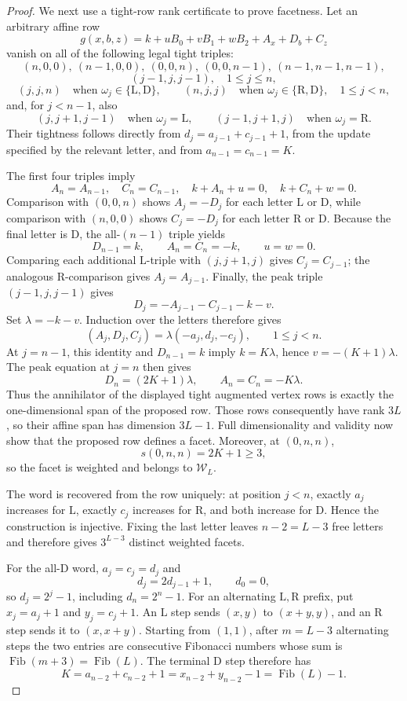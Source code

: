 \documentclass{article}
\begin{document}
\begin{proof}
We next use a tight-row rank certificate to prove facetness.  Let an arbitrary affine row
\[
 g(x,b,z)=k+uB_0+vB_1+wB_2+A_x+D_b+C_z
\]
vanish on all of the following legal tight triples:
\[
 (n,0,0),\ (n-1,0,0),\ (0,0,n),\ (0,0,n-1),\ (n-1,n-1,n-1),
\]
\[
 (j-1,j,j-1),\quad 1\le j\le n,
\]
\[
 (j,j,n)\quad\text{when }\omega_j\in\{\mathrm L,\mathrm D\},
 \qquad
 (n,j,j)\quad\text{when }\omega_j\in\{\mathrm R,\mathrm D\},
 \quad 1\le j<n,
\]
and, for \(j<n-1\), also
\[
 (j,j+1,j-1)\quad\text{when }\omega_j=\mathrm L,
 \qquad
 (j-1,j+1,j)\quad\text{when }\omega_j=\mathrm R.
\]
Their tightness follows directly from \(d_j=a_{j-1}+c_{j-1}+1\), from the update specified by the relevant letter, and from \(a_{n-1}=c_{n-1}=K\).

The first four triples imply
\[
 A_n=A_{n-1},\quad C_n=C_{n-1},\quad
 k+A_n+u=0,\quad k+C_n+w=0.
\]
Comparison with \((0,0,n)\) shows \(A_j=-D_j\) for each letter \(\mathrm L\) or \(\mathrm D\), while comparison with \((n,0,0)\) shows \(C_j=-D_j\) for each letter \(\mathrm R\) or \(\mathrm D\).  Because the final letter is \(\mathrm D\), the all-\((n-1)\) triple yields
\[
 D_{n-1}=k,\qquad A_n=C_n=-k,\qquad u=w=0.
\]
Comparing each additional \(\mathrm L\)-triple with \((j,j+1,j)\) gives \(C_j=C_{j-1}\); the analogous \(\mathrm R\)-comparison gives \(A_j=A_{j-1}\).  Finally, the peak triple \((j-1,j,j-1)\) gives
\[
 D_j=-A_{j-1}-C_{j-1}-k-v.
\]
Set \(\lambda=-k-v\).  Induction over the letters therefore gives
\[
 (A_j,D_j,C_j)=\lambda(-a_j,d_j,-c_j),\qquad 1\le j<n.
\]
At \(j=n-1\), this identity and \(D_{n-1}=k\) imply \(k=K\lambda\), hence \(v=-(K+1)\lambda\).  The peak equation at \(j=n\) then gives
\[
 D_n=(2K+1)\lambda,\qquad A_n=C_n=-K\lambda.
\]
Thus the annihilator of the displayed tight augmented vertex rows is exactly the one-dimensional span of the proposed row.  Those rows consequently have rank \(3L\), so their affine span has dimension \(3L-1\).  Full dimensionality and validity now show that the proposed row defines a facet.  Moreover, at \((0,n,n)\),
\[
 s(0,n,n)=2K+1\ge3,
\]
so the facet is weighted and belongs to \(\mathcal W_L\).

The word is recovered from the row uniquely: at position \(j<n\), exactly \(a_j\) increases for \(\mathrm L\), exactly \(c_j\) increases for \(\mathrm R\), and both increase for \(\mathrm D\).  Hence the construction is injective.  Fixing the last letter leaves \(n-2=L-3\) free letters and therefore gives \(3^{L-3}\) distinct weighted facets.

For the all-\(\mathrm D\) word, \(a_j=c_j=d_j\) and
\[
 d_j=2d_{j-1}+1,\qquad d_0=0,
\]
so \(d_j=2^j-1\), including \(d_n=2^n-1\).  For an alternating \(\mathrm L,\mathrm R\) prefix, put \(x_j=a_j+1\) and \(y_j=c_j+1\).  An \(\mathrm L\) step sends \((x,y)\) to \((x+y,y)\), and an \(\mathrm R\) step sends it to \((x,x+y)\).  Starting from \((1,1)\), after \(m=L-3\) alternating steps the two entries are consecutive Fibonacci numbers whose sum is \(\operatorname{Fib}(m+3)=\operatorname{Fib}(L)\).  The terminal \(\mathrm D\) step therefore has
\[
 K=a_{n-2}+c_{n-2}+1=x_{n-2}+y_{n-2}-1=\operatorname{Fib}(L)-1.
\]
\end{proof}
\end{document}
